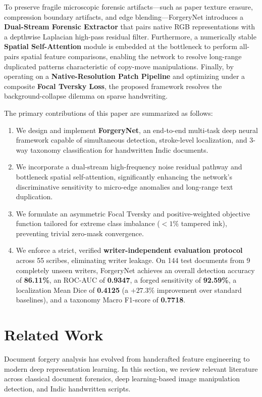 \documentclass[runningheads]{llncs}
\begin{document}
To preserve fragile microscopic forensic artifacts---such as paper texture erasure, compression boundary artifacts, and edge blending---ForgeryNet introduces a \textbf{Dual-Stream Forensic Extractor} that pairs native RGB representations with a depthwise Laplacian high-pass residual filter. Furthermore, a numerically stable \textbf{Spatial Self-Attention} module is embedded at the bottleneck to perform all-pairs spatial feature comparisons, enabling the network to resolve long-range duplicated patterns characteristic of copy-move manipulations. Finally, by operating on a \textbf{Native-Resolution Patch Pipeline} and optimizing under a composite \textbf{Focal Tversky Loss}, the proposed framework resolves the background-collapse dilemma on sparse handwriting.

\noindent
The primary contributions of this paper are summarized as follows:
\begin{enumerate}[1.]
    \item We design and implement \textbf{ForgeryNet}, an end-to-end multi-task deep neural framework capable of simultaneous detection, stroke-level localization, and 3-way taxonomy classification for handwritten Indic documents.
    \item We incorporate a dual-stream high-frequency noise residual pathway and bottleneck spatial self-attention, significantly enhancing the network's discriminative sensitivity to micro-edge anomalies and long-range text duplication.
    \item We formulate an asymmetric Focal Tversky and positive-weighted objective function tailored for extreme class imbalance ($<1\%$ tampered ink), preventing trivial zero-mask convergence.
    \item We enforce a strict, verified \textbf{writer-independent evaluation protocol} across 55 scribes, eliminating writer leakage. On 144 test documents from 9 completely unseen writers, ForgeryNet achieves an overall detection accuracy of \textbf{86.11\%}, an ROC-AUC of \textbf{0.9347}, a forged sensitivity of \textbf{92.59\%}, a localization Mean Dice of \textbf{0.4125} (a $+27.3\%$ improvement over standard baselines), and a taxonomy Macro F1-score of \textbf{0.7718}.
\end{enumerate}

\section{Related Work}\label{sec2}

Document forgery analysis has evolved from handcrafted feature engineering to modern deep representation learning. In this section, we review relevant literature across classical document forensics, deep learning-based image manipulation detection, and Indic handwritten scripts.
\end{document}
